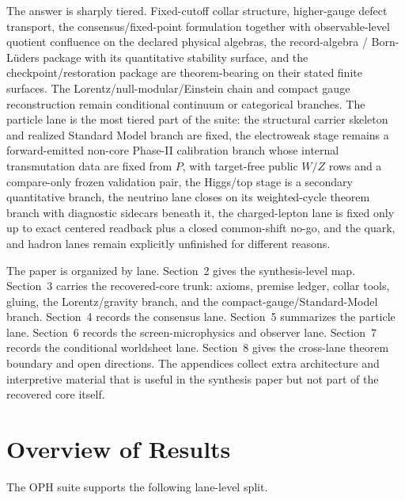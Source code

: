 \documentclass[11pt]{article}
\begin{document}
The answer is sharply tiered. Fixed-cutoff collar structure, higher-gauge defect transport,
the consensus/fixed-point formulation together with observable-level quotient confluence on the
declared physical algebras, the
record-algebra / Born-L\"uders package with its quantitative stability surface, and the
checkpoint/restoration package are theorem-bearing on their stated finite
surfaces. The Lorentz/null-modular/Einstein chain and compact gauge reconstruction remain
conditional continuum or categorical branches. The particle lane is the most tiered part of
the suite: the structural carrier skeleton and realized Standard Model branch are fixed, the
electroweak stage remains a forward-emitted non-core Phase-II calibration branch whose internal
transmutation data are fixed from \(P\), with target-free public \(W/Z\) rows and a compare-only
frozen validation pair, the Higgs/top stage is a secondary quantitative branch, the neutrino lane
closes on its weighted-cycle theorem branch with diagnostic sidecars beneath it, the charged-lepton lane is fixed
only up to exact centered readback plus a closed common-shift no-go, and the quark,
and hadron lanes remain explicitly unfinished for different reasons.

The paper is organized by lane. Section~2 gives the synthesis-level map. Section~3 carries the
recovered-core trunk: axioms, premise ledger, collar tools, gluing, the Lorentz/gravity branch,
and the compact-gauge/Standard-Model branch. Section~4 records the consensus lane. Section~5
summarizes the particle lane. Section~6 records the screen-microphysics and observer lane.
Section~7 records the conditional worldsheet lane. Section~8 gives the cross-lane theorem
boundary and open directions. The appendices collect extra architecture and interpretive
material that is useful in the synthesis paper but not part of the recovered core itself.

\section{Overview of Results}

The OPH suite supports the following lane-level split.
\end{document}
